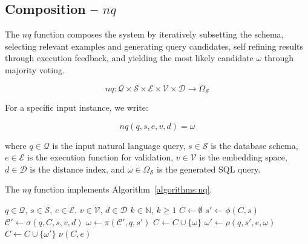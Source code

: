 \subsection{Composition – $nq$}

The $nq$ function composes the system by iteratively subsetting the schema,
selecting relevant examples and generating query candidates, self refining
results through execution feedback, and yielding the most likely
candidate $\omega$ through majority voting.

$$
nq: \mathcal{Q} \times \mathcal{S} \times \mathcal{E} \times \mathcal{V} \times \mathcal{D} \rightarrow \Omega_{\mathcal{S}}
$$

\vspace{0.5em}

For a specific input instance, we write:

$$
nq(q, s, e, v, d) = \omega
$$

\vspace{0.5em}

where $q \in \mathcal{Q}$ is the input natural language query, $s \in \mathcal{S}$
is the database schema, $e \in \mathcal{E}$ is the execution function for validation,
$v \in \mathcal{V}$ is the embedding space, $d \in \mathcal{D}$ is the distance index,
and $\omega \in \Omega_{\mathcal{S}}$ is the generated SQL query.

The $nq$ function implements Algorithm~\ref{algorithms:nq}.

\begin{algorithm}
\caption{$nq$ - Natural Query Pipeline}\label{algorithms:nq}
\begin{algorithmic}[1]
\Require $q \in \mathcal{Q}$, $s \in \mathcal{S}$, $e \in \mathcal{E}$, $v \in \mathcal{V}$, $d \in \mathcal{D}$
\Require $k \in \mathbb{N}$, $k \geq 1$             
\State $C \gets \emptyset$                          
                                   
    \State $s' \gets \phi(C, s)$                    
    \State $\mathcal{C}' \gets \sigma(q, C, s, v, d)$ 
    \State $\omega \gets \pi(\mathcal{C}', q, s')$  
                                
        \State $C \gets C \cup \{\omega\}$          
    \EndIf
    \State $\omega' \gets \rho(q, s', e, \omega)$   
                               
        \State $C \gets C \cup \{\omega'\}$         
    \EndIf
\EndWhile
\State \Return $\nu(C, e)$                          
\end{algorithmic}
\end{algorithm}
